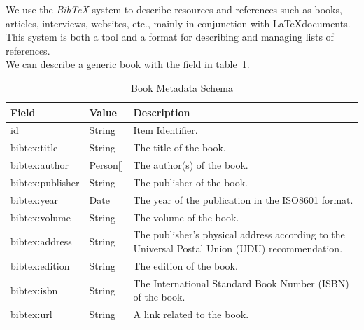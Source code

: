 We use the \textit{BibTeX} system to describe resources and references such as books, articles, interviews, websites, etc., mainly in conjunction with \LaTeX\space documents. This system is both a tool and a format for describing and managing lists of references.\\
We can describe a generic book with the field in table~\ref{tab:c4-book}.

\begin{longtable}{|p{}|p{}|p{}|}
    \caption{Book Metadata Schema} \label{tab:c4-book} \\
    \hline
    \textbf{Field} & \textbf{Value} & \textbf{Description} \\
    \hline

    \scriptsize id                                    & \scriptsize String                         & \scriptsize Item Identifier. \\
    \hline
    \scriptsize bibtex:title                          & \scriptsize String                         & \scriptsize The title of the book. \\
    \hline
    \scriptsize bibtex:author                         & \scriptsize \textcolor{uniudColor3}{Person}[] & \scriptsize The author(s) of the book. \\
    \hline
    \scriptsize bibtex:publisher                      & \scriptsize String                         & \scriptsize The publisher of the book. \\
    \hline
    \scriptsize bibtex:year                           & \scriptsize Date                           & \scriptsize The year of the publication in the ISO8601 format. \\
    \hline
   \scriptsize  bibtex:volume                         & \scriptsize String                         & \scriptsize The volume of the book. \\
    \hline
    \scriptsize bibtex:address                        & \scriptsize String                         & \scriptsize The publisher's physical address according to the Universal Postal Union (UDU) recommendation. \\
    \hline
    \scriptsize bibtex:edition                        & \scriptsize String                         & \scriptsize The edition of the book. \\
    \hline
    \scriptsize bibtex:isbn                           & \scriptsize String                         & \scriptsize The International Standard Book Number (ISBN) of the book. \\
    \hline
    \scriptsize bibtex:url                            & \scriptsize String                         & \scriptsize A link related to the book. \\
    \hline

\end{longtable}

